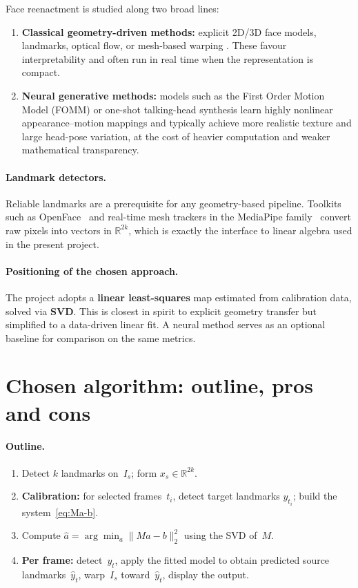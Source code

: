 \documentclass[11pt,a4paper]{article}
\begin{document}
Face reenactment is studied along two broad lines:
\begin{enumerate}
  \item \textbf{Classical geometry-driven methods:} explicit 2D/3D face models,
        landmarks, optical flow, or mesh-based warping
        \cite{thies2016face2face}. These favour interpretability and often run in
        real time when the representation is compact.
  \item \textbf{Neural generative methods:} models such as the First Order Motion
        Model (FOMM) \cite{siarohin2019first} or one-shot talking-head synthesis
        \cite{zakharov2020oneshot} learn highly nonlinear appearance--motion
        mappings and typically achieve more realistic texture and large head-pose
        variation, at the cost of heavier computation and weaker mathematical
        transparency.
\end{enumerate}

\paragraph{Landmark detectors.}
Reliable landmarks are a prerequisite for any geometry-based pipeline. Toolkits such
as OpenFace~\cite{baltrusaitis2016openface} and real-time mesh trackers in the
MediaPipe family~\cite{kartynnik2019attention} convert raw pixels into vectors in
$\mathbb{R}^{2k}$, which is exactly the interface to linear algebra used in the
present project.

\paragraph{Positioning of the chosen approach.}
The project adopts a \textbf{linear least-squares} map estimated from calibration
data, solved via \textbf{SVD}. This is closest in spirit to explicit geometry transfer
\cite{thies2016face2face} but simplified to a data-driven linear fit. A neural method
serves as an optional baseline for comparison on the same metrics.

\section{Chosen algorithm: outline, pros and cons}
\label{sec:algorithm}

\paragraph{Outline.}
\begin{enumerate}
  \item Detect $k$ landmarks on~$I_s$; form $x_s \in \mathbb{R}^{2k}$.
  \item \textbf{Calibration:} for selected frames~$t_i$, detect target landmarks
        $y_{t_i}$; build the system~\eqref{eq:Ma-b}.
  \item Compute $\hat{a} = \arg\min_a \|Ma-b\|_2^2$ using the SVD of~$M$.
  \item \textbf{Per frame:} detect~$y_t$, apply the fitted model to obtain
        predicted source landmarks~$\hat{y}_t$, warp~$I_s$ toward~$\hat{y}_t$,
        display the output.
\end{enumerate}
\end{document}
